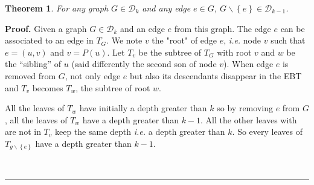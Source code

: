 \documentclass[preprint]{elsarticle}
\newtheorem{theorem}{Theorem}
\newenvironment{proof}[1][Proof]{\textbf{#1.} }{\ \rule{0.5em}{0.5em}}
\newcommand{\set}[1]{\left\{ #1 \right\}}
\newcommand{\card}[1]{\left| #1 \right|}
\newcommand{\mcalg}{\mathcal{G}}
\newcommand{\mcald}{\mathcal{D}}
\newcommand{\compbin}[1]{\mathcal{C}_{\mbox{\scriptsize{B}}}\left( #1 \right)}
\begin{document}
\begin{theorem}
For any graph $G \in \mcald_k$ and any edge $e \in G$, $G \backslash \set{e} \in \mcald_{k-1}$.
\label{th:completebinary}
\end{theorem}
\begin{proof}
Given a graph $G \in \mcald_k$ and an edge $e$ from this graph. The edge $e$ can be associated to an edge in $T_G$. We note $v$ the "root" of edge $e$, {\em i.e.} node $v$ such that $e = (u, v)$ and $v = P(u)$. Let $T_v$ be the subtree of $T_G$ with root $v$ and $w$ be the ``sibling'' of $u$ (said differently the second son of node $v$). When edge $e$ is removed from $G$, not only edge $e$ but also its descendants disappear in the EBT and $T_v$ becomes $T_w$, the subtree of root $w$.

All the leaves of $T_w$ have initially a depth greater than $k$ so by removing $e$ from $G$, all the leaves of $T_w$ have a depth greater than $k-1$. All the other leaves with are not in $T_v$ keep the same depth {\em i.e.} a depth greater than $k$. So every leaves of $T_{g \backslash \set{e}}$ have a depth greater than $k-1$.
%
%
%

\end{proof}
\end{document}
